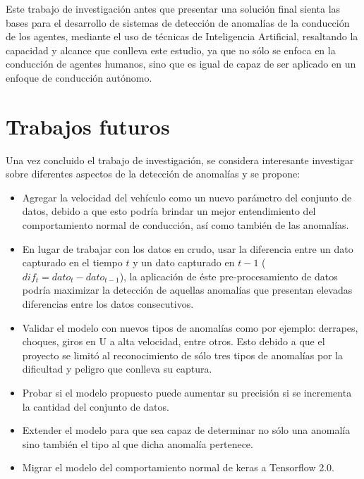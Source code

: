 Este trabajo de investigaci\'{o}n antes que presentar una soluci\'{o}n final sienta las bases para el desarrollo de sistemas de detecci\'{o}n de anomal\'{i}as de la conducci\'{o}n de los agentes, mediante el uso de t\'{e}cnicas de Inteligencia Artificial, resaltando la capacidad y alcance que conlleva este estudio, ya que no s\'{o}lo se enfoca en la conducci\'{o}n de agentes humanos, sino que es igual de capaz de ser aplicado en un enfoque de conducci\'{o}n aut\'{o}nomo.

\section{Trabajos futuros}

Una vez concluido el trabajo de investigaci\'{o}n, se considera interesante investigar sobre diferentes aspectos de la detecci\'{o}n de anomal\'{i}as y se propone:

\begin{itemize}
\item Agregar la velocidad del veh\'{i}culo como un nuevo par\'{a}metro del conjunto de datos, debido a que esto podr\'{i}a brindar un mejor entendimiento del comportamiento normal de conducci\'{o}n, as\'{i} como tambi\'{e}n de las anomal\'{i}as.
\item En lugar de trabajar con los datos en crudo, usar la diferencia entre un dato capturado en el tiempo $t$ y un dato capturado en $t-1$ ($dif_{t} = dato_{t}-dato_{t-1}$), la aplicaci\'{o}n de \'{e}ste pre-procesamiento de datos podr\'{i}a maximizar la detecci\'{o}n de aquellas anomal\'{i}as que presentan elevadas diferencias entre los datos consecutivos.
\item Validar el modelo con nuevos tipos de anomal\'{i}as como por ejemplo: derrapes, choques, giros en U a alta velocidad, entre otros. Esto debido a que el proyecto se limit\'{o} al reconocimiento de s\'{o}lo tres tipos de anomal\'{i}as por la dificultad y peligro que conlleva su captura.
\item Probar si el modelo propuesto puede aumentar su precisi\'{o}n si se incrementa la cantidad del conjunto de datos.
\item Extender el modelo para que sea capaz de determinar no s\'{o}lo una anomal\'{i}a sino tambi\'{e}n el tipo al que dicha anomal\'{i}a pertenece.
\item Migrar el modelo del comportamiento normal de keras a Tensorflow 2.0.

\end{itemize}

 


